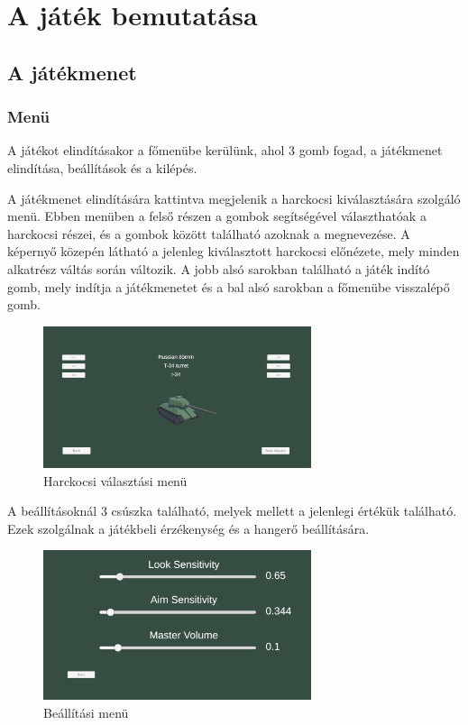 \documentclass[
]{thesis-ekf}
\theoremstyle{definition}
\theoremstyle{remark}
\begin{document}
\chapter{A játék bemutatása}

\section{A játékmenet}

\subsection{Menü}

A játékot elindításakor a főmenübe kerülünk, ahol 3 gomb fogad, a játékmenet elindítása, beállítások és a kilépés.

A játékmenet elindítására kattintva megjelenik a harckocsi kiválasztására szolgáló menü. Ebben menüben a felső részen a gombok segítségével választhatóak a harckocsi részei, és a gombok között található azoknak a megnevezése. A képernyő közepén látható a jelenleg kiválasztott harckocsi előnézete, mely minden alkatrész váltás során változik. A jobb alsó sarokban található a játék indító gomb, mely indítja a játékmenetet és a bal alsó sarokban a főmenübe visszalépő gomb.


\begin{figure}[H]
    \centering
    \includegraphics[width=0.7\textwidth]{screenshots/selectionmenu.png}
    \caption{Harckocsi választási menü}
    \label{fig:selectionmenu}
\end{figure}

A beállításoknál 3 csúszka található, melyek mellett a jelenlegi értékük található. Ezek szolgálnak a játékbeli érzékenység és a hangerő beállítására.

\begin{figure}[H]
    \centering
    \includegraphics[width=0.7\textwidth]{screenshots/settings.png}
    \caption{Beállítási menü}
    \label{fig:settings}
\end{figure}
\end{document}
